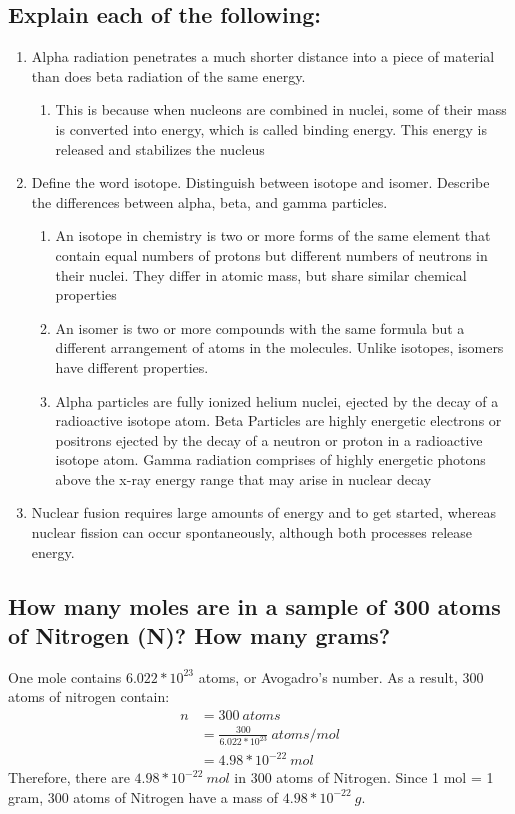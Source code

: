 \documentclass[11pt]{article}
\begin{document}
\subsection{Explain each of the following:}
\label{sec:org85c3cd4}
\begin{enumerate}
\item Alpha radiation penetrates a much shorter distance into a piece of material than does beta radiation of the same energy.
\begin{enumerate}
\item This is because when nucleons are combined in nuclei, some of their mass is converted into energy, which is called binding energy. This energy is released and stabilizes the nucleus
\end{enumerate}
\item Define the word isotope. Distinguish between isotope and isomer. Describe the differences between alpha, beta, and gamma particles.
\begin{enumerate}
\item An isotope in chemistry is two or more forms of the same element that contain equal numbers of protons but different numbers of neutrons in their nuclei. They differ in atomic mass, but share similar chemical properties
\item An isomer is two or more compounds with the same formula but a different arrangement of atoms in the molecules. Unlike isotopes, isomers have different properties.
\item Alpha particles are fully ionized helium nuclei, ejected by the decay of a radioactive isotope atom. Beta Particles are highly energetic electrons or positrons ejected by the decay of a neutron or proton in a radioactive isotope atom. Gamma radiation comprises of highly energetic photons above the x-ray energy range that may arise in nuclear decay
\end{enumerate}
\item Nuclear fusion requires large amounts of energy and to get started, whereas nuclear fission can occur spontaneously, although both processes release energy.
\end{enumerate}

\subsection{How many moles are in a sample of 300 atoms of Nitrogen (N)? How many grams?}
\label{sec:orgf703a05}
One mole contains \(6.022 *10^{23}\) atoms, or Avogadro's number. As a result, 300 atoms of nitrogen contain:
\begin{align*}
n&=300\ atoms\\
&=\frac{300}{6.022*10^{23}}\ atoms/mol\\
&=4.98*10^{-22}\ mol
\end{align*}
Therefore, there are \(4.98*10^{-22}\ mol\) in 300 atoms of Nitrogen. Since 1 mol = 1 gram, 300 atoms of Nitrogen have a mass of \(4.98*10^{-22}\ g\).
\end{document}
